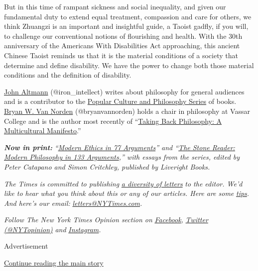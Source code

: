 But in this time of rampant sickness and social inequality, and given
our fundamental duty to extend equal treatment, compassion and care for
others, we think Zhuangzi is an important and insightful guide, a Taoist
gadfly, if you will, to challenge our conventional notions of
flourishing and health. With the 30th anniversary of the Americans With
Disabilities Act approaching, this ancient Chinese Taoist reminds us
that it is the material conditions of a society that determine and
define disability. We have the power to change both those material
conditions and the definition of disability.

\href{https://independent.academia.edu/JohnAltmann}{John Altmann}
(@iron\_intellect) writes about philosophy for general audiences and is
a contributor to the
\href{http://www.opencourtbooks.com/categories/pcp.htm}{Popular Culture
and Philosophy Series} of books.
\href{http://www.bryanvannorden.com/}{Bryan W. Van Norden}
(@bryanvannorden) holds a chair in philosophy at Vassar College and is
the author most recently of
``\href{http://cup.columbia.edu/book/taking-back-philosophy/9780231184373}{Taking
Back Philosophy: A Multicultural Manifesto}.''

\emph{\textbf{Now in print:}}
\emph{``}\href{http://bitly.com/1MW2kN3}{\emph{Modern Ethics in 77
Arguments}}\emph{'' and ``}\href{http://bitly.com/1MW2kN3}{\emph{The
Stone Reader: Modern Philosophy in 133 Arguments}}\emph{,'' with essays
from the series, edited by Peter Catapano and Simon Critchley, published
by Liveright Books.}

\emph{The Times is committed to publishing}
\href{https://www.nytimes3xbfgragh.onion/2019/01/31/opinion/letters/letters-to-editor-new-york-times-women.html}{\emph{a
diversity of letters}} \emph{to the editor. We'd like to hear what you
think about this or any of our articles. Here are some}
\href{https://help.nytimes3xbfgragh.onion/hc/en-us/articles/115014925288-How-to-submit-a-letter-to-the-editor}{\emph{tips}}\emph{.
And here's our email:}
\href{mailto:letters@NYTimes.com}{\emph{letters@NYTimes.com}}\emph{.}

\emph{Follow The New York Times Opinion section on}
\href{https://www.facebookcorewwwi.onion/nytopinion}{\emph{Facebook}}\emph{,}
\href{http://twitter.com/NYTOpinion}{\emph{Twitter (@NYTopinion)}}
\emph{and}
\href{https://www.instagram.com/nytopinion/}{\emph{Instagram}}\emph{.}

Advertisement

\protect\hyperlink{after-bottom}{Continue reading the main story}

